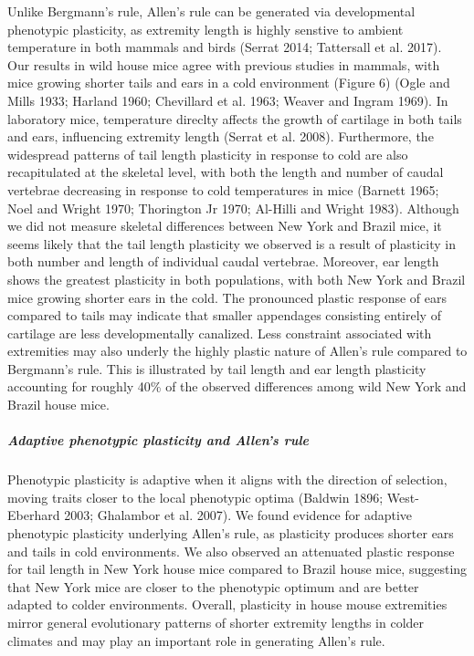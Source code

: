 \documentclass[]{article}
\let\oldsubparagraph\subparagraph
\renewcommand{\subparagraph}[1]{\oldsubparagraph{#1}\mbox{}}
\begin{document}
Unlike Bergmann's rule, Allen's rule can be generated via developmental
phenotypic plasticity, as extremity length is highly senstive to ambient
temperature in both mammals and birds (Serrat 2014; Tattersall et al.
2017). Our results in wild house mice agree with previous studies in
mammals, with mice growing shorter tails and ears in a cold environment
(Figure 6) (Ogle and Mills 1933; Harland 1960; Chevillard et al. 1963;
Weaver and Ingram 1969). In laboratory mice, temperature direclty
affects the growth of cartilage in both tails and ears, influencing
extremity length (Serrat et al. 2008). Furthermore, the widespread
patterns of tail length plasticity in response to cold are also
recapitulated at the skeletal level, with both the length and number of
caudal vertebrae decreasing in response to cold temperatures in mice
(Barnett 1965; Noel and Wright 1970; Thorington Jr 1970; Al-Hilli and
Wright 1983). Although we did not measure skeletal differences between
New York and Brazil mice, it seems likely that the tail length
plasticity we observed is a result of plasticity in both number and
length of individual caudal vertebrae. Moreover, ear length shows the
greatest plasticity in both populations, with both New York and Brazil
mice growing shorter ears in the cold. The pronounced plastic response
of ears compared to tails may indicate that smaller appendages
consisting entirely of cartilage are less developmentally canalized.
Less constraint associated with extremities may also underly the highly
plastic nature of Allen's rule compared to Bergmann's rule. This is
illustrated by tail length and ear length plasticity accounting for
roughly 40\% of the observed differences among wild New York and Brazil
house mice.

\vspace{2.5mm}

\hypertarget{adaptive-phenotypic-plasticity-and-allens-rule}{%
\subparagraph{\texorpdfstring{\emph{Adaptive phenotypic plasticity and
Allen's
rule}}{Adaptive phenotypic plasticity and Allen's rule}}\label{adaptive-phenotypic-plasticity-and-allens-rule}}

Phenotypic plasticity is adaptive when it aligns with the direction of
selection, moving traits closer to the local phenotypic optima (Baldwin
1896; West-Eberhard 2003; Ghalambor et al. 2007). We found evidence for
adaptive phenotypic plasticity underlying Allen's rule, as plasticity
produces shorter ears and tails in cold environments. We also observed
an attenuated plastic response for tail length in New York house mice
compared to Brazil house mice, suggesting that New York mice are closer
to the phenotypic optimum and are better adapted to colder environments.
Overall, plasticity in house mouse extremities mirror general
evolutionary patterns of shorter extremity lengths in colder climates
and may play an important role in generating Allen's rule.
\end{document}
